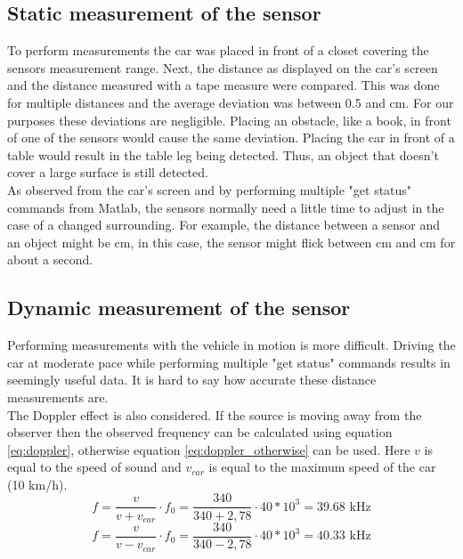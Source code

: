 \documentclass[final]{scrreprt} %
\begin{document}
\subsection{Static measurement of the sensor}

To perform measurements the car was placed in front of a closet covering the sensors measurement range. 
Next, the distance as displayed on the car's screen and the distance measured with a tape measure were compared. 
This was done for multiple distances and the average deviation was between 0.5 and \unit[1]{cm}. 
For our purposes these deviations are negligible. 
Placing an obstacle, like a book, in front of one of the sensors would cause the same deviation.
Placing the car in front of a table would result in the table leg being detected. 
Thus, an object that doesn't cover a large surface is still detected.\\ 
As observed from the car's screen and by performing multiple "get status" commands from Matlab, the sensors normally need a little time to adjust in the case of a changed surrounding. 
For example, the distance between a sensor and an object might be \unit[75]{cm}, in this case, the sensor might flick between \unit[75]{cm} and \unit[74]{cm} for about a second.


\subsection{Dynamic measurement of the sensor}

Performing measurements with the vehicle in motion is more difficult. Driving the car at moderate pace while performing multiple "get status" commands results in seemingly useful data. 
It is hard to say how accurate these distance measurements are.\\ 
The Doppler effect is also considered. 
If the source is moving away from the observer then the observed frequency can be calculated using equation \ref{eq:doppler}, otherwise equation \ref{eq:doppler_otherwise} can be used. Here $v$ is equal to the speed of sound and $v_{car}$ is equal to the maximum speed of the car (10 km/h).
\begin{equation} 
\label{eq:doppler}
f = \dfrac{v}{v+v_{car}} \cdot f_{0} = \dfrac{340}{340 + 2,78} \cdot {40*10^3} = 39.68 \text{ kHz}
\end{equation}
\begin{equation} 
\label{eq:doppler_otherwise}
f = \dfrac{v}{v-v_{car}} \cdot f_{0} = \dfrac{340}{340 - 2,78} \cdot {40*10^3} = 40.33 \text{ kHz}
\end{equation}
\end{document}
